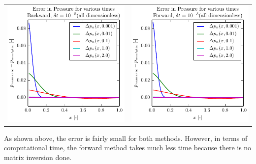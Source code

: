 \documentclass{article}
\begin{document}
\begin{tabular}{c c}
\includegraphics[scale=1.0]{error_backward_small.pdf} &
\includegraphics[scale=1.0]{error_forward_small.pdf}
\end{tabular}

As shown above, the error is fairly small for both methods. However, in terms of computational time, the forward method takes much less time because there is no matrix inversion done.
\end{document}

